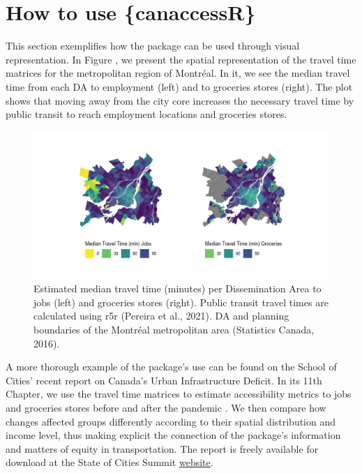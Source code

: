\documentclass[Royal,times,sageh]{sagej}
\begin{document}
\section{How to use \{canaccessR\}}\label{how-to-use-canaccessr}

This section exemplifies how the package can be used through visual
representation. In Figure \citet{fig-travel_time_emp_grc_plot}, we
present the spatial representation of the travel time matrices for the
metropolitan region of Montréal. In it, we see the median travel time
from each DA to employment (left) and to groceries stores (right). The
plot shows that moving away from the city core increases the necessary
travel time by public transit to reach employment locations and
groceries stores.

\begin{figure}[H]
\includegraphics[width=1\linewidth]{../figures/patch_tt_emp_grc} \caption{Estimated median travel time (minutes) per Dissemination Area to jobs (left) and groceries stores (right). Public transit travel times are calculated using {r5r} (Pereira et al., 2021). DA and planning boundaries of the Montréal metropolitan area (Statistics Canada, 2016).}\label{fig:fig-travel_time_emp_grc_plot}
\end{figure}

A more thorough example of the package's use can be found on the School
of Cities' recent report on Canada's Urban Infrastructure Deficit. In
its 11th Chapter, we use the travel time matrices to estimate
accessibility metrics to jobs and groceries stores before and after the
pandemic \citep{pargaDemocraticAccessOur2024}. We then compare how
changes affected groups differently according to their spatial
distribution and income level, thus making explicit the connection of
the package's information and matters of equity in transportation. The
report is freely available for download at the State of Cities Summit
\href{https://stateofcitiessummit.ca/report}{website}.
\end{document}

